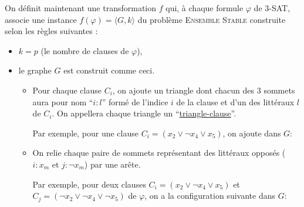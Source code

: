 \begin{exercice}
  On définit maintenant une transformation $f$ qui, à chaque formule $\varphi$ de \textsc{3-SAT},
  associe une instance \linebreak $f(\varphi) = \langle G, k\rangle$ du problème \textsc{Ensemble Stable} construite selon les règles suivantes :
  \begin{itemize}
  \item $k=p$ (le nombre de clauses de $\varphi$),
  \item le graphe $G$ est construit comme ceci.
    \begin{itemize}
    \item Pour chaque clause $C_i$, on ajoute un triangle dont chacun des 3 sommets aura pour nom ``$i:l$''
      formé de l'indice $i$ de la clause et d'un des littéraux $l$ de $C_i$.
      On appellera chaque triangle un ``\underline{triangle-clause}''.

      Par exemple, pour une clause $C_i=(x_2\vee \neg x_4 \vee x_5)$, on ajoute dans $G$:

      \begin{center}
      \end{center}

    \item On relie chaque paire de sommets représentant des littéraux opposés ($i : x_m$ et $j : \neg x_m$) par une arête.

      Par exemple, pour deux clauses $C_i=(x_2\vee \neg x_4 \vee x_5)$ et $C_j=(\neg x_2\vee \neg x_4 \vee \neg x_5)$ de $\varphi$, on a la configuration suivante dans $G$:

      \begin{center}
\end{center}
\end{itemize}
\end{itemize}
\end{exercice}
